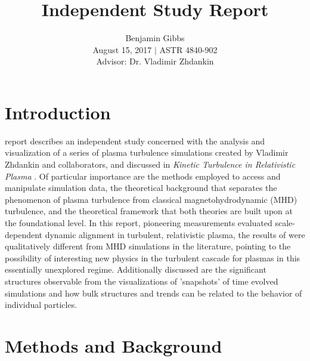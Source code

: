 \documentclass[journal, a4paper]{IEEEtran}
\begin{document}
	\title{Independent Study Report}
	\author{Benjamin Gibbs\\ \vspace{.35cm} August 15, 2017 $\vert$ ASTR 4840-902\\ \vspace{.35cm} Advisor: Dr. Vladimir Zhdankin\\}
	\maketitle


\vspace{.4cm}
\section{Introduction}
\vspace{.4cm}
	 report describes an independent study concerned with the analysis and visualization of a series of plasma turbulence simulations created by Vladimir Zhdankin and collaborators, and discussed in \textit{Kinetic Turbulence in Relativistic Plasma} \cite{zhdankin}. Of particular importance are the methods employed to access and manipulate simulation data, the theoretical background that separates the phenomenon of plasma turbulence from classical magnetohydrodynamic (MHD) turbulence, and the theoretical framework that both theories are built upon at the foundational level. In this report, pioneering measurements evaluated scale-dependent dynamic alignment in turbulent, relativistic plasma, the results of were qualitatively different from MHD simulations in the literature\cite{boldyrev}, pointing to the possibility of interesting new physics in the turbulent cascade for plasmas in this essentially unexplored regime. Additionally discussed are the significant structures observable from the visualizations of 'snapshots' of time evolved simulations and how bulk structures and trends can be related to the behavior of individual particles.

\vspace{.5cm}
\section{Methods and Background}
\vspace{.3cm}
\end{document}
